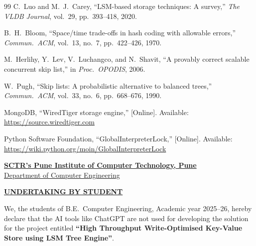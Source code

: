 \documentclass[oneside,a4paper,12pt]{book}
\begin{document}
\begin{thebibliography}{99}
C.~Luo and M.~J.~Carey, ``LSM-based storage techniques: A survey,'' \textit{The VLDB Journal}, vol.~29, pp.~393--418, 2020.

B.~H.~Bloom, ``Space/time trade-offs in hash coding with allowable errors,'' \textit{Commun.\ ACM}, vol.~13, no.~7, pp.~422--426, 1970.

M.~Herlihy, Y.~Lev, V.~Luchangco, and N.~Shavit, ``A provably correct scalable concurrent skip list,'' in \textit{Proc.\ OPODIS}, 2006.

W.~Pugh, ``Skip lists: A probabilistic alternative to balanced trees,'' \textit{Commun.\ ACM}, vol.~33, no.~6, pp.~668--676, 1990.

MongoDB, ``WiredTiger storage engine,'' [Online]. Available: \url{https://source.wiredtiger.com}

Python Software Foundation, ``GlobalInterpreterLock,'' [Online]. Available: \url{https://wiki.python.org/moin/GlobalInterpreterLock}

\end{thebibliography}


\newpage
\thispagestyle{empty}
\setlength{\parindent}{0pt}

\begin{center}
    {\fontsize{15}{17}\selectfont \textbf{\underline{SCTR's Pune Institute of Computer Technology, Pune}}}\\[0.5em]
    {\fontsize{14}{15}\selectfont \underline{Department of Computer Engineering}}
\end{center}

\vspace*{5\baselineskip}

\begin{center}
    {\fontsize{15}{16}\selectfont \textbf{\underline{UNDERTAKING BY STUDENT}}}
\end{center}

\vspace*{2\baselineskip}

\setlength{\parindent}{5em}
We, the students of B.E.\ Computer Engineering, Academic year 2025--26, hereby declare that the AI tools like ChatGPT are not used for developing the solution for the project entitled \textbf{``High Throughput Write-Optimised Key-Value Store using LSM Tree Engine''}.
\end{document}
